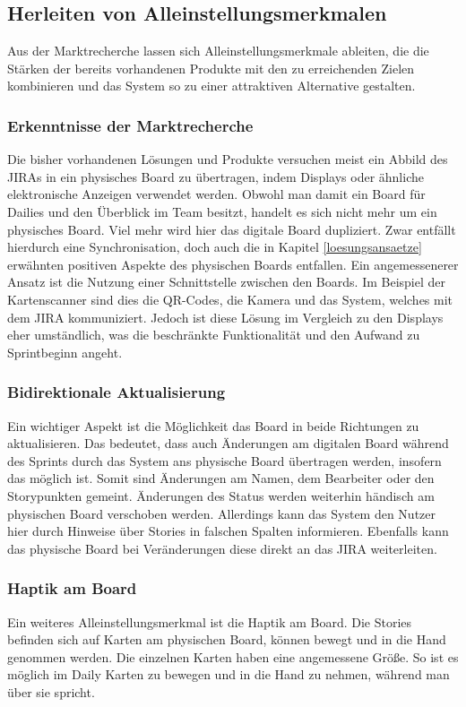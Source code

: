 \documentclass[12pt,titlepage]{scrartcl}
\begin{document}
	\subsection{Herleiten von Alleinstellungsmerkmalen}	
	Aus der Marktrecherche lassen sich Alleinstellungsmerkmale ableiten, die die Stärken der bereits vorhandenen Produkte mit den zu erreichenden Zielen kombinieren und das System so zu einer attraktiven Alternative gestalten.
		\subsubsection{Erkenntnisse der Marktrecherche}
		Die bisher vorhandenen Lösungen und Produkte versuchen meist ein Abbild des JIRAs in ein physisches Board zu übertragen, indem Displays oder ähnliche elektronische Anzeigen verwendet werden. Obwohl man damit ein Board für Dailies und den Überblick im Team besitzt, handelt es sich nicht mehr um ein physisches Board. Viel mehr wird hier das digitale Board dupliziert. Zwar entfällt hierdurch eine Synchronisation, doch auch die in Kapitel \ref{loesungsansaetze} erwähnten positiven Aspekte des physischen Boards entfallen. Ein angemessenerer Ansatz ist die Nutzung einer Schnittstelle zwischen den Boards. Im Beispiel der Kartenscanner sind dies die QR-Codes, die Kamera und das System, welches mit dem JIRA kommuniziert. Jedoch ist diese Lösung im Vergleich zu den Displays eher umständlich, was die beschränkte Funktionalität und den Aufwand zu Sprintbeginn angeht.
		\subsubsection{Bidirektionale Aktualisierung}
		Ein wichtiger Aspekt ist die Möglichkeit das Board in beide Richtungen zu aktualisieren. Das bedeutet, dass auch Änderungen am digitalen Board während des Sprints durch das System ans physische Board übertragen werden, insofern das möglich ist. Somit sind Änderungen am Namen, dem Bearbeiter oder den Storypunkten gemeint. Änderungen des Status werden weiterhin händisch am physischen Board verschoben werden. Allerdings kann das System den Nutzer hier durch Hinweise über Stories in falschen Spalten informieren. Ebenfalls kann das physische Board bei Veränderungen diese direkt an das JIRA weiterleiten.
		\subsubsection{Haptik am Board}
		Ein weiteres Alleinstellungsmerkmal ist die Haptik am Board. Die Stories befinden sich auf Karten am physischen Board, können bewegt und in die Hand genommen werden. Die einzelnen Karten haben eine angemessene Größe. So ist es möglich im Daily Karten zu bewegen und in die Hand zu nehmen, während man über sie spricht. 
\end{document}
